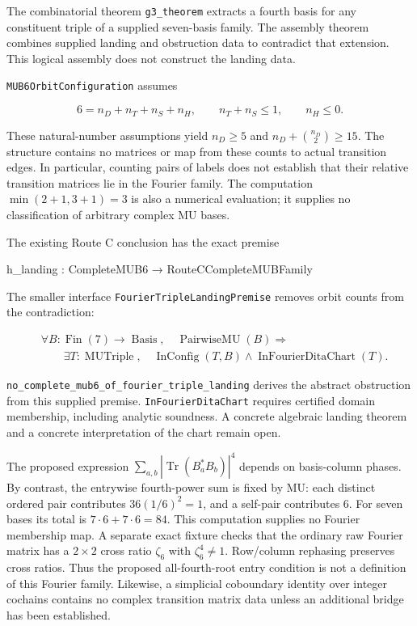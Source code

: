 \documentclass[
]{article}
\newenvironment{Shaded}{}{}
\newcommand{\NormalTok}[1]{#1}
\begin{document}
The combinatorial theorem \nolinkurl{g3_theorem} extracts a fourth basis
for any constituent triple of a supplied seven-basis family. The
assembly theorem combines supplied landing and obstruction data to
contradict that extension. This logical assembly does not construct the
landing data.

\nolinkurl{MUB6OrbitConfiguration} assumes

\[
6=n_D+n_T+n_S+n_H,\qquad n_T+n_S\le1,\qquad n_H\le0.
\]

These natural-number assumptions yield \(n_D\ge5\) and
\(n_D+\binom{n_D}{2}\ge15\). The structure contains no matrices or map
from these counts to actual transition edges. In particular, counting
pairs of labels does not establish that their relative transition
matrices lie in the Fourier family. The computation \(\min(2+1,3+1)=3\)
is also a numerical evaluation; it supplies no classification of
arbitrary complex MU bases.

The existing Route C conclusion has the exact premise

\begin{Shaded}
\begin{Highlighting}[]
\NormalTok{h\_landing : CompleteMUB6 → RouteCCompleteMUBFamily}
\end{Highlighting}
\end{Shaded}

The smaller interface \nolinkurl{FourierTripleLandingPremise} removes
orbit counts from the contradiction:

\[
\begin{aligned}
&\forall B:\operatorname{Fin}(7)\to\operatorname{Basis},\quad
\operatorname{PairwiseMU}(B)\Rightarrow\\
&\qquad\exists T:\operatorname{MUTriple},\quad
\operatorname{InConfig}(T,B)\land\operatorname{InFourierDitaChart}(T).
\end{aligned}
\]

\nolinkurl{no_complete_mub6_of_fourier_triple_landing} derives the
abstract obstruction from this supplied premise.
\nolinkurl{InFourierDitaChart} requires certified domain membership,
including analytic soundness. A concrete algebraic landing theorem and a
concrete interpretation of the chart remain open.

The proposed expression \(\sum_{a,b}|\operatorname{Tr}(B_a^*B_b)|^4\)
depends on basis-column phases. By contrast, the entrywise fourth-power
sum is fixed by MU: each distinct ordered pair contributes
\(36(1/6)^2=1\), and a self-pair contributes \(6\). For seven bases its
total is \(7\cdot6+7\cdot6=84\). This computation supplies no Fourier
membership map. A separate exact fixture checks that the ordinary raw
Fourier matrix has a \(2\times2\) cross ratio \(\zeta_6\) with
\(\zeta_6^4\ne1\). Row/column rephasing preserves cross ratios. Thus the
proposed all-fourth-root entry condition is not a definition of this
Fourier family. Likewise, a simplicial coboundary identity over integer
cochains contains no complex transition matrix data unless an additional
bridge has been established.
\end{document}
